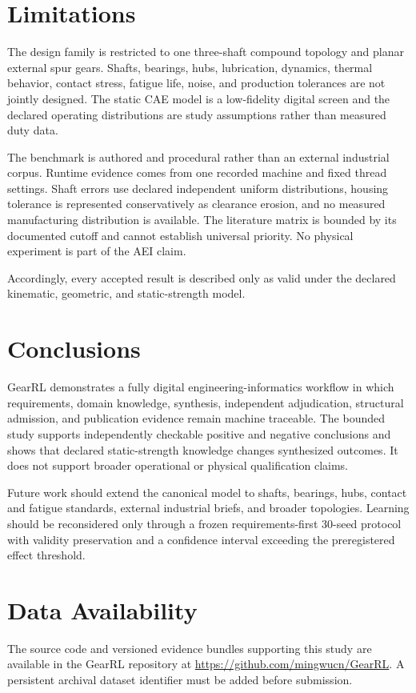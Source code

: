 \documentclass[preprint,12pt]{elsarticle}
\begin{document}
\section{Limitations}
The design family is restricted to one three-shaft compound topology and planar external spur gears. Shafts, bearings, hubs, lubrication, dynamics, thermal behavior, contact stress, fatigue life, noise, and production tolerances are not jointly designed. The static CAE model is a low-fidelity digital screen and the declared operating distributions are study assumptions rather than measured duty data.

The benchmark is authored and procedural rather than an external industrial corpus. Runtime evidence comes from one recorded machine and fixed thread settings. Shaft errors use declared independent uniform distributions, housing tolerance is represented conservatively as clearance erosion, and no measured manufacturing distribution is available. The literature matrix is bounded by its documented cutoff and cannot establish universal priority. No physical experiment is part of the AEI claim.

Accordingly, every accepted result is described only as valid under the declared kinematic, geometric, and static-strength model.

\section{Conclusions}
GearRL demonstrates a fully digital engineering-informatics workflow in which requirements, domain knowledge, synthesis, independent adjudication, structural admission, and publication evidence remain machine traceable. The bounded study supports independently checkable positive and negative conclusions and shows that declared static-strength knowledge changes synthesized outcomes. It does not support broader operational or physical qualification claims.

Future work should extend the canonical model to shafts, bearings, hubs, contact and fatigue standards, external industrial briefs, and broader topologies. Learning should be reconsidered only through a frozen requirements-first 30-seed protocol with validity preservation and a confidence interval exceeding the preregistered effect threshold.

\section{Data Availability}
The source code and versioned evidence bundles supporting this study are available in the GearRL repository at \url{https://github.com/mingwucn/GearRL}. A persistent archival dataset identifier must be added before submission.
\end{document}
